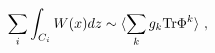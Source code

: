 \begin{equation}
  \label{eq:up}
  \sum_i \int_{C_i} W(x)dz 
\sim \langle\sum_k g_k{\rm Tr} \Phi^k\rangle\ ,
\end{equation}

